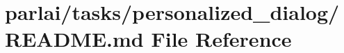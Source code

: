 \hypertarget{parlai_2tasks_2personalized__dialog_2README_8md}{}\section{parlai/tasks/personalized\+\_\+dialog/\+R\+E\+A\+D\+ME.md File Reference}
\label{parlai_2tasks_2personalized__dialog_2README_8md}
